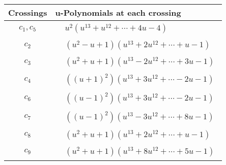 \documentclass[1p]{elsarticle_modified}
\theoremstyle{definition}
\begin{document}
\begin{tabular}{m{50pt}|m{274pt}}
Crossings & \hspace{64pt}u-Polynomials at each crossing \\
\hline $$\begin{aligned}c_{1},c_{5}\end{aligned}$$&$\begin{aligned}
&u^2(u^{13}+u^{12}+\cdots+4 u-4)
\end{aligned}$\\
\hline $$\begin{aligned}c_{2}\end{aligned}$$&$\begin{aligned}
&(u^2- u+1)(u^{13}+2 u^{12}+\cdots+u-1)
\end{aligned}$\\
\hline $$\begin{aligned}c_{3}\end{aligned}$$&$\begin{aligned}
&(u^2+u+1)(u^{13}-2 u^{12}+\cdots+3 u-1)
\end{aligned}$\\
\hline $$\begin{aligned}c_{4}\end{aligned}$$&$\begin{aligned}
&((u+1)^2)(u^{13}+3 u^{12}+\cdots-2 u-1)
\end{aligned}$\\
\hline $$\begin{aligned}c_{6}\end{aligned}$$&$\begin{aligned}
&((u-1)^2)(u^{13}+3 u^{12}+\cdots-2 u-1)
\end{aligned}$\\
\hline $$\begin{aligned}c_{7}\end{aligned}$$&$\begin{aligned}
&((u-1)^2)(u^{13}-3 u^{12}+\cdots+8 u-1)
\end{aligned}$\\
\hline $$\begin{aligned}c_{8}\end{aligned}$$&$\begin{aligned}
&(u^2+u+1)(u^{13}+2 u^{12}+\cdots+u-1)
\end{aligned}$\\
\hline $$\begin{aligned}c_{9}\end{aligned}$$&$\begin{aligned}
&(u^2+u+1)(u^{13}+8 u^{12}+\cdots+5 u-1)
\end{aligned}$\\
\hline
\end{tabular}\newpage\renewcommand{\arraystretch}{1}
\end{document}
